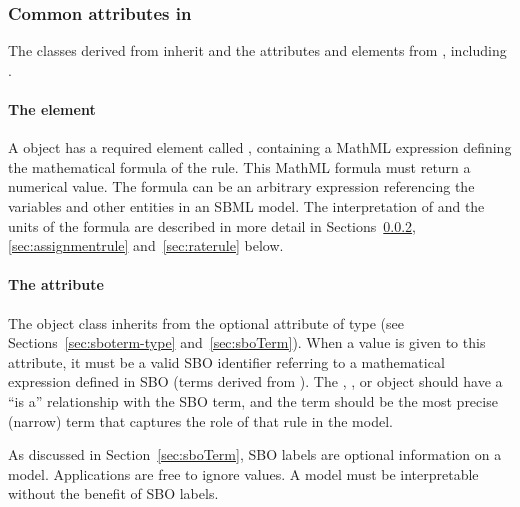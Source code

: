 \subsubsection{Common attributes in }
\label{sec:rule-math}\label{sec:rule-fields}\label{sec:rule-sboterm}

The classes derived from \Rule inherit  and
  the attributes and elements from \SBase, including
.


\paragraph{The  element}

A \Rule object has a required element called ,
containing a MathML expression defining the mathematical formula
of the rule.  This MathML formula must return a numerical value.
The formula can be an arbitrary expression referencing the
variables and other entities in an SBML model.  The interpretation
of  and the units of the formula are described in more
detail in Sections~\ref{sec:algebraicrule},
\ref{sec:assignmentrule} and~\ref{sec:raterule} below.


\paragraph{The  attribute}

The \Rule object class inherits from \SBase the optional  attribute of type
 (see Sections~\ref{sec:sboterm-type}
and~\ref{sec:sboTerm}).  When a value is given to this attribute, it
must be a valid SBO identifier referring to a mathematical
expression defined in SBO (\ie terms derived from
\sbomathformula).  The \AlgebraicRule, \AssignmentRule, or
\RateRule object should have a ``is a'' relationship with the SBO
term, and the term should be the most precise (narrow) term that
captures the role of that rule in the model.

As discussed in Section~\ref{sec:sboTerm}, SBO labels are optional
information on a model.  Applications are free to ignore
 values.  A model must be interpretable without the
benefit of SBO labels.


\subsubsection{}
\label{sec:algebraicrule}

